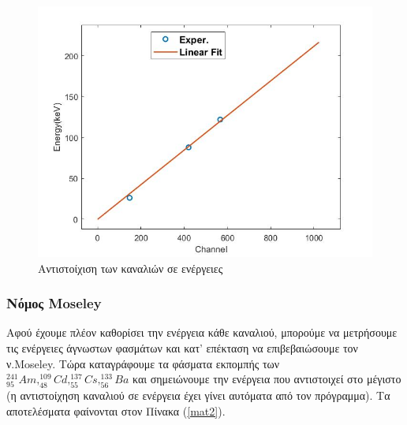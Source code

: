 \documentclass[a4paper]{article}
\begin{document}
		\begin{figure}[h!]
			\centering
			\includegraphics[scale=0.7]{channel_distr.jpg}
			\caption{Αντιστοίχιση των καναλιών σε ενέργειες}
			\label{im2}
		\end{figure}
		
		
	\subsubsection*{Νόμος Moseley}
		
		Αφού έχουμε πλέον καθορίσει την ενέργεια κάθε καναλιού, μπορούμε να μετρήσουμε τις ενέργειες άγνωστων φασμάτων και κατ' επέκταση να επιβεβαιώσουμε τον ν.Moseley. Τώρα καταγράφουμε τα φάσματα εκπομπής των $^{241}_{95}Am,^{109}_{48}Cd,^{137}_{55}Cs,^{133}_{56}Ba$ και  σημειώνουμε την ενέργεια που αντιστοιχεί στο μέγιστο (η αντιστοίχηση καναλιού σε ενέργεια έχει γίνει αυτόματα από τον πρόγραμμα). Τα αποτελέσματα φαίνονται στον Πίνακα (\ref{mat2}).
		
\end{document}
